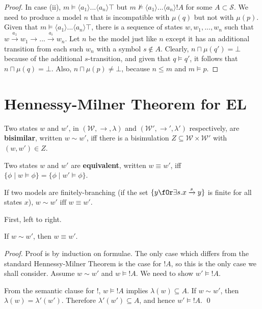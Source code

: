 \begin{proof}
In case (ii), $m \models \langle a_1 \rangle ... \langle a_n \rangle \top$ but $m \nvDash \langle a_1 \rangle ... \langle a_n \rangle !A$ for some $A \subset \mathcal{S}$. We need to produce a model $n$ that is incompatible with $\mu(q)$ but not with $\mu(p)$. Given that $m \models \langle a_1 \rangle ... \langle a_n \rangle \top$, there is a sequence of states $w, w_1, ..., w_n$ such that $w \xrightarrow{a_1} w_1 \rightarrow ... \xrightarrow{a_i} w_n$. Let $n$ be the model just like $n$ except it has an additional transition from each such $w_n$ with a symbol $s \notin A$. Clearly, $n \sqcap \mu(q') = \bot$ because of the additional $s$-transition, and given that $q \models q'$, it follows that $n \sqcap \mu(q) = \bot$. Also, $n \sqcap \mu(p) \neq \bot$, because $n \leq m$ and $m \models p$.


\end{proof}

\section{Hennessy-Milner Theorem for EL}

\begin{definition}
Two states $w$ and $w'$, in $(\mathcal{W}, \rightarrow, \lambda)$ and $(\mathcal{W}', \rightarrow', \lambda')$ respectively, are {\bf bisimilar}, written $w \sim w'$, iff there is a bisimulation $Z \subseteq  \mathcal{W} \times \mathcal{W}'$ with $(w,w') \in Z$.
\end{definition}

\begin{definition}
Two states $w$ and $w'$ are {\bf equivalent}, written $w \equiv w'$, iff $\{\phi \; | \; w \models \phi\} = \{\phi \; | \; w' \models \phi\}$.
\end{definition}
\begin{theorem}
If two models are finitely-branching (if the set $\{y \fOr \exists s . x \xrightarrow{s} y\}$ is finite for all states $x$), $w \sim w' \mbox{ iff } w \equiv w' $.
\end{theorem}
First, left to right.
\begin{case}
If $w \sim w'$, then $w \equiv w'$.
\end{case}
\begin{proof}
Proof is by induction on formulae.
The only case which differs from the standard Hennessy-Milner Theorem is the case for $!A$, so this is the only case we shall consider.
Assume $w \sim w'$ and $w \models !A$. We need to show $w' \models !A$.

From the semantic clause for $!$,  $w \models !A$ implies $\lambda(w) \subseteq A$.
If $w \sim w'$, then $\lambda(w) = \lambda'(w')$.
Therefore $\lambda'(w') \subseteq A$, and hence $w' \models !A$.
\qed
\end{proof}

